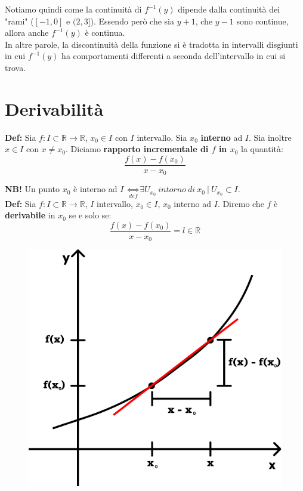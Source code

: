 \documentclass{article}
\begin{document}
\noindent Notiamo quindi come la continuità di $f^{-1}(y)$ dipende dalla continuità dei "rami" ($[-1, 0]$ e $(2, 3]$). Essendo però che sia $y + 1$, che $y - 1$ sono continue, allora anche $f^{-1}(y)$ è continua.\\
In altre parole, la discontinuità della funzione si è tradotta in intervalli disgiunti in cui $f^{-1}(y)$ ha comportamenti differenti a seconda dell'intervallo in cui si trova.

\section{Derivabilità}
\textbf{Def:} Sia $f: I \subset \mathbb{R} \xrightarrow{} \mathbb{R}$, $x_0 \in I$ con $I$ intervallo. Sia $x_0$ \textbf{interno} ad $I$. Sia inoltre $x \in I$ con $x \neq x_0$. Diciamo \textbf{rapporto incrementale di $f$ in $x_0$} la quantità:
\begin{equation*}
    \frac{f(x) - f(x_0)}{x - x_0}
\end{equation*}

\noindent\textbf{NB!} Un punto $x_0$ è interno ad $I$ $\underset{def}{\iff} \exists U_{x_0} \ intorno \ di \ x_0 \ | \ U_{x_0} \subset I$.\\

\noindent\textbf{Def:} Sia $f: I \subset \mathbb{R} \xrightarrow{} \mathbb{R}$, $I$ intervallo, $x_0 \in I$, $x_0$ interno ad $I$. Diremo che $f$ è \textbf{derivabile} in $x_0$ se e solo se: 
\begin{equation*}
    \frac{f(x) - f(x_0)}{x - x_0} = l \in \mathbb{R}
\end{equation*}

\begin{figure}
\includegraphics[width=0.9\linewidth]{./images/derivative.pdf}
\end{figure}
\end{document}
